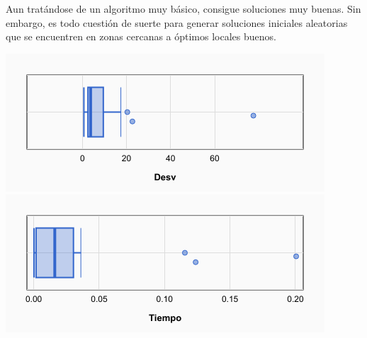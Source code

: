 \documentclass[a4paper, 12pt]{article}
\begin{document}
	Aun tratándose de un algoritmo muy básico, consigue soluciones muy buenas. Sin embargo, es todo cuestión de suerte para generar soluciones iniciales aleatorias que se encuentren en zonas cercanas a óptimos locales buenos.

	\begin{center}
         \includegraphics[scale=0.5]{desv-bmb}
         \includegraphics[scale=0.5]{time-bmb}
      \end{center}
      
      \newpage
\end{document}

